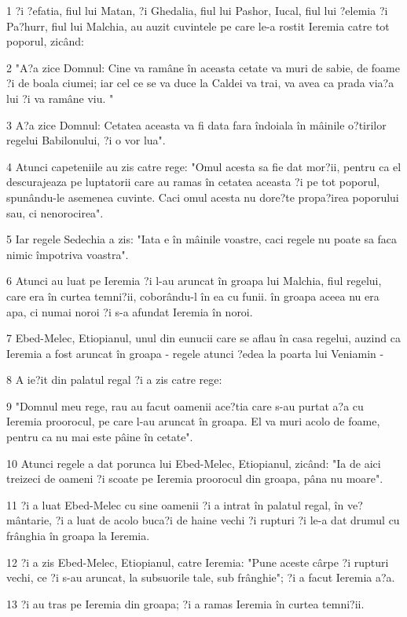 \par 1 ?i ?efatia, fiul lui Matan, ?i Ghedalia, fiul lui Pashor, Iucal, fiul lui ?elemia ?i Pa?hurr, fiul lui Malchia, au auzit cuvintele pe care le-a rostit Ieremia catre tot poporul, zicând:
\par 2 "A?a zice Domnul: Cine va ramâne în aceasta cetate va muri de sabie, de foame ?i de boala ciumei; iar cel ce se va duce la Caldei va trai, va avea ca prada via?a lui ?i va ramâne viu. "
\par 3 A?a zice Domnul: Cetatea aceasta va fi data fara îndoiala în mâinile o?tirilor regelui Babilonului, ?i o vor lua".
\par 4 Atunci capeteniile au zis catre rege: "Omul acesta sa fie dat mor?ii, pentru ca el descurajeaza pe luptatorii care au ramas în cetatea aceasta ?i pe tot poporul, spunându-le asemenea cuvinte. Caci omul acesta nu dore?te propa?irea poporului sau, ci nenorocirea".
\par 5 Iar regele Sedechia a zis: "Iata e în mâinile voastre, caci regele nu poate sa faca nimic împotriva voastra".
\par 6 Atunci au luat pe Ieremia ?i l-au aruncat în groapa lui Malchia, fiul regelui, care era în curtea temni?ii, coborându-l în ea cu funii. în groapa aceea nu era apa, ci numai noroi ?i s-a afundat Ieremia în noroi.
\par 7 Ebed-Melec, Etiopianul, unul din eunucii care se aflau în casa regelui, auzind ca Ieremia a fost aruncat în groapa - regele atunci ?edea la poarta lui Veniamin -
\par 8 A ie?it din palatul regal ?i a zis catre rege:
\par 9 "Domnul meu rege, rau au facut oamenii ace?tia care s-au purtat a?a cu Ieremia proorocul, pe care l-au aruncat în groapa. El va muri acolo de foame, pentru ca nu mai este pâine în cetate".
\par 10 Atunci regele a dat porunca lui Ebed-Melec, Etiopianul, zicând: "Ia de aici treizeci de oameni ?i scoate pe Ieremia proorocul din groapa, pâna nu moare".
\par 11 ?i a luat Ebed-Melec cu sine oamenii ?i a intrat în palatul regal, în ve?mântarie, ?i a luat de acolo buca?i de haine vechi ?i rupturi ?i le-a dat drumul cu frânghia în groapa la Ieremia.
\par 12 ?i a zis Ebed-Melec, Etiopianul, catre Ieremia: "Pune aceste cârpe ?i rupturi vechi, ce ?i s-au aruncat, la subsuorile tale, sub frânghie"; ?i a facut Ieremia a?a.
\par 13 ?i au tras pe Ieremia din groapa; ?i a ramas Ieremia în curtea temni?ii.
